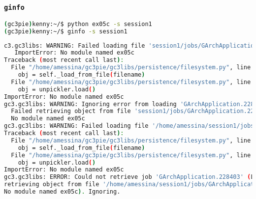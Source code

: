 \documentclass[english,serif,mathserif,xcolor=pdftex,dvipsnames,table]{beamer}
\begin{document}
\begin{frame}[fragile]
  \frametitle{\texttt{ginfo} }
  \begin{lstlisting}[language=sh,basicstyle=\tt\tiny]
(gc3pie)kenny:~/$ python ex05c -s session1
(gc3pie)kenny:~/$ ginfo -s session1
\end{lstlisting}
\pause  \begin{lstlisting}[language=sh,basicstyle=\tt\tiny]
c3.gc3libs: WARNING: Failed loading file 'session1/jobs/GArchApplication.228403':
   ImportError: No module named ex05c
Traceback (most recent call last):
  File "/home/amessina/gc3pie/gc3libs/persistence/filesystem.py", line 115, in load
    obj = self._load_from_file(filename)
  File "/home/amessina/gc3pie/gc3libs/persistence/filesystem.py", line 92, in _load_from_file
    obj = unpickler.load()
ImportError: No module named ex05c
gc3.gc3libs: WARNING: Ignoring error from loading 'GArchApplication.228403': 
  Failed retrieving object from file 'session1/jobs/GArchApplication.228403': ImportError: 
  No module named ex05c
gc3.gc3libs: WARNING: Failed loading file '/home/amessina/session1/jobs/GArchApplication.228403': ImportError: No module named ex05c
Traceback (most recent call last):
  File "/home/amessina/gc3pie/gc3libs/persistence/filesystem.py", line 115, in load
    obj = self._load_from_file(filename)
  File "/home/amessina/gc3pie/gc3libs/persistence/filesystem.py", line 92, in _load_from_file
    obj = unpickler.load()
ImportError: No module named ex05c
gc3.gc3libs: ERROR: Could not retrieve job 'GArchApplication.228403' (LoadError: Failed 
retrieving object from file '/home/amessina/session1/jobs/GArchApplication.228403': ImportError: 
No module named ex05c). Ignoring.
  \end{lstlisting} %
\end{frame}
\end{document}
